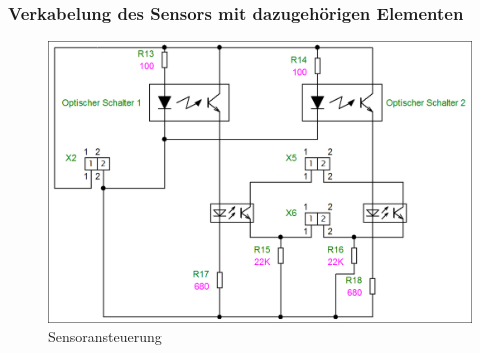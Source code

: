 \subsubsection{Verkabelung des Sensors mit dazugehörigen Elementen} 
\begin{figure}[H] 
\begin{center}

\includegraphics[width=15cm]{Bilder/Schaltplan/Sensoransteuerung}
\caption{Sensoransteuerung}
\label{Sensoransteuerung}

\end{center}
\end{figure}

